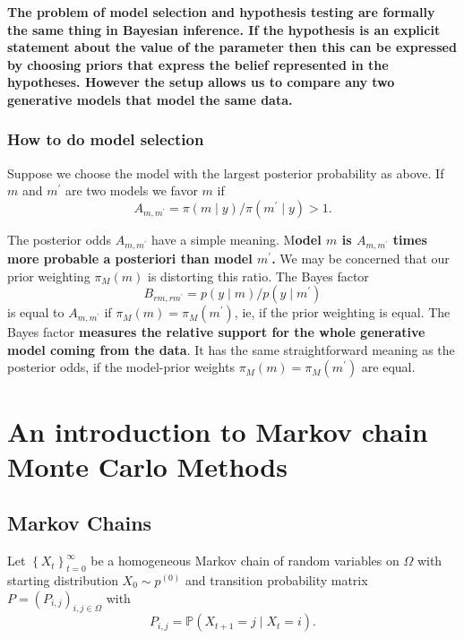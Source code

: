 \documentclass{article}
\begin{document}
\textbf{The problem of model selection and hypothesis testing are formally the same thing in Bayesian  inference. If the hypothesis is an explicit statement about the value of the parameter then this can  be expressed by choosing priors that express the belief represented in the hypotheses. However the  setup allows us to compare any two generative models that model the same data. }

\subsubsection{How to do model selection}

Suppose we choose the model with the largest posterior probability as above. If $m$ and $m^{\prime}$ are two models we favor $m$ if
$$
A_{m, m^{\prime}}=\pi(m \mid y) / \pi\left(m^{\prime} \mid y\right)>1 .
$$

The posterior odds $A_{m, m^{\prime}}$ have a simple meaning. M\textbf{odel $m$ is $A_{m, m^{\prime}}$ times more probable a posteriori than model $m^{\prime}$.} We may be concerned that our prior weighting $\pi_M(m)$ is distorting this ratio. The Bayes factor
$$
B_{r m, r m^{\prime}}=p(y \mid m) / p\left(y \mid m^{\prime}\right)
$$
is equal to $A_{m, m^{\prime}}$ if $\pi_M(m)=\pi_M\left(m^{\prime}\right)$, ie, if the prior weighting is equal. The Bayes factor\textbf{ measures the relative support for the whole generative model coming from the data}. It has the same straightforward meaning as the posterior odds, if the model-prior weights $\pi_M(m)=\pi_M\left(m^{\prime}\right)$ are equal.

\section{An introduction to Markov chain Monte Carlo Methods}
\subsection{Markov Chains}
Let $\left\{X_t\right\}_{t=0}^{\infty}$ be a homogeneous Markov chain of random variables on $\Omega$ with starting distribution $X_0 \sim p^{(0)}$ and transition probability matrix $P=\left(P_{i, j}\right)_{i, j \in \Omega}$ with
$$
P_{i, j}=\mathbb{P}\left(X_{t+1}=j \mid X_t=i\right) .
$$
\end{document}
